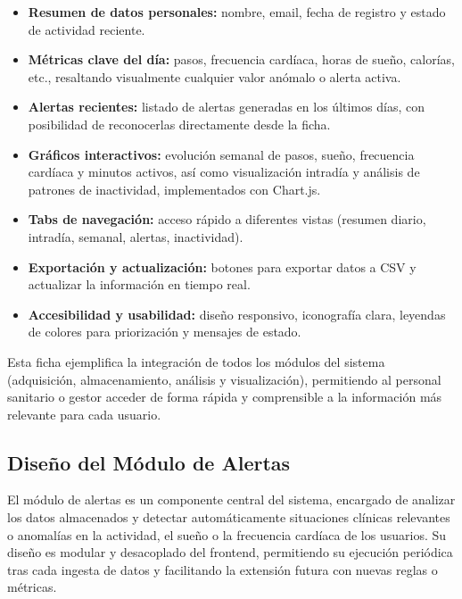 \begin{itemize}
    \item \textbf{Resumen de datos personales:} nombre, email, fecha de registro y estado de actividad reciente.
    \item \textbf{Métricas clave del día:} pasos, frecuencia cardíaca, horas de sueño, calorías, etc., resaltando visualmente cualquier valor anómalo o alerta activa.
    \item \textbf{Alertas recientes:} listado de alertas generadas en los últimos días, con posibilidad de reconocerlas directamente desde la ficha.
    \item \textbf{Gráficos interactivos:} evolución semanal de pasos, sueño, frecuencia cardíaca y minutos activos, así como visualización intradía y análisis de patrones de inactividad, implementados con Chart.js.
    \item \textbf{Tabs de navegación:} acceso rápido a diferentes vistas (resumen diario, intradía, semanal, alertas, inactividad).
    \item \textbf{Exportación y actualización:} botones para exportar datos a CSV y actualizar la información en tiempo real.
    \item \textbf{Accesibilidad y usabilidad:} diseño responsivo, iconografía clara, leyendas de colores para priorización y mensajes de estado.
\end{itemize}

Esta ficha ejemplifica la integración de todos los módulos del sistema (adquisición, almacenamiento, análisis y visualización), permitiendo al personal sanitario o gestor acceder de forma rápida y comprensible a la información más relevante para cada usuario.

\subsection{Diseño del Módulo de Alertas}
\label{subsec:diseno_alertas}

El módulo de alertas es un componente central del sistema, encargado de analizar los datos almacenados y detectar automáticamente situaciones clínicas relevantes o anomalías en la actividad, el sueño o la frecuencia cardíaca de los usuarios. Su diseño es modular y desacoplado del frontend, permitiendo su ejecución periódica tras cada ingesta de datos y facilitando la extensión futura con nuevas reglas o métricas.

